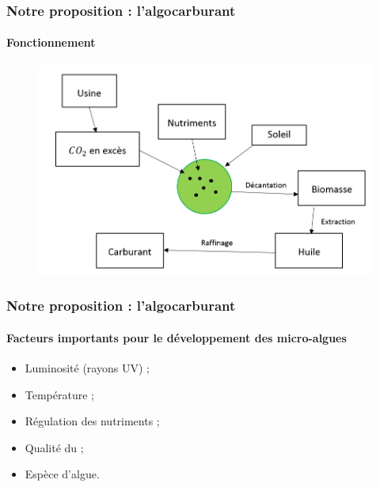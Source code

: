 \documentclass{beamer}
\begin{document}
	\begin{frame}
		\frametitle{Notre proposition : l'algocarburant}
		\framesubtitle{Fonctionnement}
		\begin{figure}
			\centering
			\includegraphics[scale=0.55]{media/fonctionnement.png}
		\end{figure}
	\end{frame}
	
	\begin{frame}
		\frametitle{Notre proposition : l'algocarburant}
		\framesubtitle{Facteurs importants pour le développement des micro-algues}
		\Large{\begin{itemize}
			\item Luminosité (rayons UV) ;
			\item Température ;
			\item Régulation des nutriments ;
			\item Qualité du \chemform{CO_2} ;
			\item Espèce d'algue.
		\end{itemize}}
	\end{frame}
	
\end{document}
